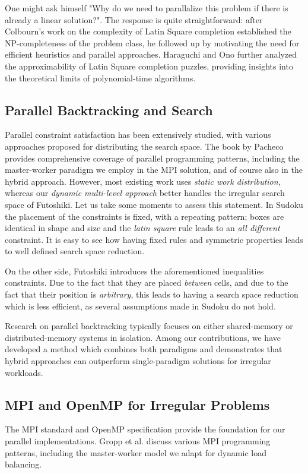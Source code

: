 One might ask himself "Why do we need to parallalize this problem if there is already a linear solution?". The response is quite straightforward: after Colbourn's work \cite{Colbourn1984} on the complexity of Latin Square completion established the NP-completeness of the problem class, he followed up by motivating the need for efficient heuristics and parallel approaches. Haraguchi and Ono \cite{Haraguchi2014} further analyzed the approximability of Latin Square completion puzzles, providing insights into the theoretical limits of polynomial-time algorithms.

\subsection{Parallel Backtracking and Search}
\label{subsec:backtrack}
Parallel constraint satisfaction has been extensively studied, with various approaches proposed for distributing the search space. The book by Pacheco \cite{Pacheco2011} provides comprehensive coverage of parallel programming patterns, including the master-worker paradigm we employ in the MPI solution, and of course also in the hybrid approach. However, most existing work uses \textit{static work distribution}, whereas our \textit{dynamic multi-level approach} better handles the irregular search space of Futoshiki.
Let us take some moments to assess this statement.
In Sudoku the placement of the constraints is fixed, with a repeating pattern; boxes are identical in shape and size and the \textit{latin square} rule leads to an \textit{all different} constraint. It is easy to see how having fixed rules and symmetric properties leads to well defined search space reduction.

On the other side, Futoshiki introduces the aforementioned inequalities constraints. Due to the fact that they are placed \textit{between} cells, and due to the fact that their position is \textit{arbitrary}, this leads to having a search space reduction which is less efficient, as several assumptions made in Sudoku do not hold.

Research on parallel backtracking typically focuses on either shared-memory or distributed-memory systems in isolation. Among our contributions, we have developed a method which combines both paradigms and demonstrates that hybrid approaches can outperform single-paradigm solutions for irregular workloads.

\subsection{MPI and OpenMP for Irregular Problems}
\label{subsec:mpi_omp_irregular_problems}
The MPI standard \cite{MPIForum2021} and OpenMP specification \cite{OpenMP2020} provide the foundation for our parallel implementations. Gropp et al. \cite{Gropp1999} discuss various MPI programming patterns, including the master-worker model we adapt for dynamic load balancing.

